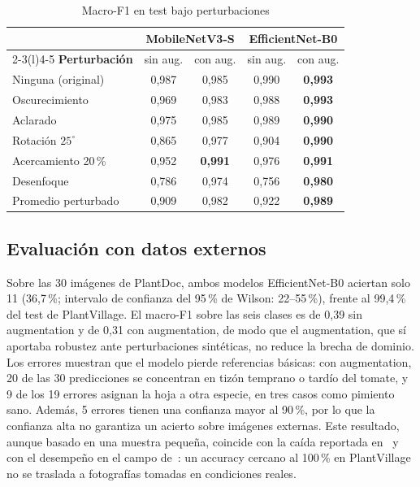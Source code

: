 \begin{table}[t]
\centering
\caption{Macro-F1 en test bajo perturbaciones}
\label{tab:robustez}
\setlength{\tabcolsep}{4pt}
\begin{tabular}{@{}lcccc@{}}
\toprule
 & \multicolumn{2}{c}{\textbf{MobileNetV3-S}} & \multicolumn{2}{c}{\textbf{EfficientNet-B0}} \\
\cmidrule(lr){2-3}\cmidrule(l){4-5}
\textbf{Perturbación} & sin aug. & con aug. & sin aug. & con aug. \\
\midrule
Ninguna (original)   & 0,987 & 0,985 & 0,990 & \textbf{0,993} \\
Oscurecimiento       & 0,969 & 0,983 & 0,988 & \textbf{0,993} \\
Aclarado             & 0,975 & 0,985 & 0,989 & \textbf{0,990} \\
Rotación $25^\circ$  & 0,865 & 0,977 & 0,904 & \textbf{0,990} \\
Acercamiento 20\,\%  & 0,952 & \textbf{0,991} & 0,976 & \textbf{0,991} \\
Desenfoque           & 0,786 & 0,974 & 0,756 & \textbf{0,980} \\
\midrule
Promedio perturbado  & 0,909 & 0,982 & 0,922 & \textbf{0,989} \\
\bottomrule
\end{tabular}
\end{table}

\subsection{Evaluación con datos externos}
\label{subsec:res_externos}
Sobre las 30 imágenes de PlantDoc, ambos modelos EfficientNet-B0 aciertan solo 11 (36,7\,\%;
intervalo de confianza del 95\,\% de Wilson: 22--55\,\%), frente al 99,4\,\% del test de
PlantVillage. El macro-F1 sobre las seis clases es de 0,39 sin augmentation y de 0,31 con
augmentation, de modo que el augmentation, que sí aportaba robustez ante perturbaciones
sintéticas, no reduce la brecha de dominio. Los errores muestran que el modelo pierde
referencias básicas: con augmentation, 20 de las 30 predicciones se concentran en tizón
temprano o tardío del tomate, y 9 de los 19 errores asignan la hoja a otra especie, en tres
casos como pimiento sano. Además, 5 errores tienen una confianza mayor al 90\,\%, por lo que la
confianza alta no garantiza un acierto sobre imágenes externas. Este
resultado, aunque basado en una muestra pequeña, coincide con la caída reportada
en~\cite{mohanty2016using} y con el desempeño en el campo de~\cite{mrisho2020accuracy}: un
accuracy cercano al 100\,\% en PlantVillage no se traslada a fotografías tomadas en
condiciones reales.

